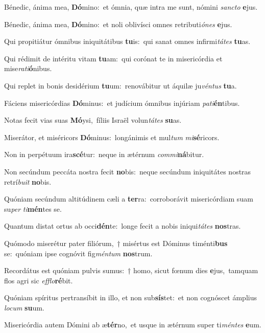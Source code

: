 \item Bénedic, ánima mea, \textbf{Dó}mino:~\psstar et ómnia, quæ intra me sunt, nómini \textit{sancto} \textbf{e}jus.
\item Bénedic, ánima mea, \textbf{Dó}mino:~\psstar et noli oblivísci omnes retributi\textit{ónes} \textbf{e}jus.
\item Qui propitiátur ómnibus iniquitátibus \textbf{tu}is:~\psstar qui sanat omnes infirmi\textit{tátes} \textbf{tu}as.
\item Qui rédimit de intéritu vitam \textbf{tu}am:~\psstar qui corónat te in misericórdia et mise\textit{rati}\textbf{ó}nibus.
\item Qui replet in bonis desidérium \textbf{tu}um:~\psstar renovábitur ut áquilæ ju\textit{véntus} \textbf{tu}a.
\item Fáciens misericórdias \textbf{Dó}minus:~\psstar et judícium ómnibus injúriam \textit{pati}\textbf{én}tibus.
\item Notas fecit vias suas \textbf{Mó}ysi,~\psstar fíliis Israël volun\textit{tátes} \textbf{su}as.
\item Miserátor, et miséricors \textbf{Dó}minus:~\psstar longánimis et mul\textit{tum} \textit{mi}\textbf{sé}ricors.
\item Non in perpétuum ira\textbf{scé}tur:~\psstar neque in ætérnum \textit{commi}\textbf{ná}bitur.
\item Non secúndum peccáta nostra fecit \textbf{no}bis:~\psstar neque secúndum iniquitátes nostras retrí\textit{buit} \textbf{no}bis.
\item Quóniam secúndum altitúdinem cæli a \textbf{ter}ra:~\psstar corroborávit misericórdiam suam su\textit{per} \textit{ti}\textbf{mén}tes se.
\item Quantum distat ortus ab occi\textbf{dén}te:~\psstar longe fecit a nobis iniqui\textit{tátes} \textbf{nos}tras.
\item Quómodo miserétur pater filiórum,~† misértus est Dóminus timénti\textbf{bus} se:~\psstar quóniam ipse cognóvit fig\textit{méntum} \textbf{nos}trum.
\item Recordátus est quóniam pulvis sumus:~† homo, sicut fœnum dies \textbf{e}jus,~\psstar tamquam flos agri sic \textit{efflo}\textbf{ré}bit.
\item Quóniam spíritus pertransíbit in illo, et non sub\textbf{sís}tet:~\psstar et non cognóscet ámplius \textit{locum} \textbf{su}um.
\item Misericórdia autem Dómini ab æ\textbf{tér}no,~\psstar et usque in ætérnum super ti\textit{méntes} \textbf{e}um.
